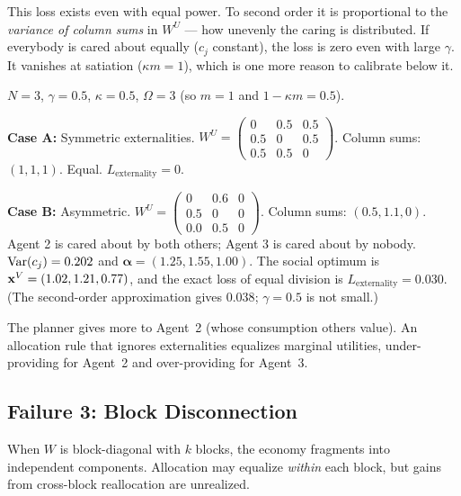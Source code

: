 \documentclass[../structural_economics_book.tex]{subfiles}
\begin{document}
This loss exists even with equal power. To second order it is proportional to the \textit{variance of column sums} in $W^U$ --- how unevenly the caring is distributed. If everybody is cared about equally ($c_j$ constant), the loss is zero even with large $\gamma$. It vanishes at satiation ($\kappa m = 1$), which is one more reason to calibrate below it.

\begin{example}\label{ch02:ex:bond}
$N = 3$, $\gamma = 0.5$, $\kappa = 0.5$, $\Omega = 3$ (so $m = 1$ and $1 - \kappa m = 0.5$).

\textbf{Case A:} Symmetric externalities. $W^U = \begin{pmatrix} 0 & 0.5 & 0.5 \\ 0.5 & 0 & 0.5 \\ 0.5 & 0.5 & 0 \end{pmatrix}$. Column sums: $(1, 1, 1)$. Equal. $L_{\text{externality}} = 0$.

\textbf{Case B:} Asymmetric. $W^U = \begin{pmatrix} 0 & 0.6 & 0 \\ 0.5 & 0 & 0 \\ 0.0 & 0.5 & 0 \end{pmatrix}$. Column sums: $(0.5, 1.1, 0)$. Agent 2 is cared about by both others; Agent 3 is cared about by nobody. $\operatorname{Var}(c_j) = 0.202$ and $\boldsymbol{\alpha} = (1.25, 1.55, 1.00)$. The social optimum is $\mathbf{x}^V = (1.02, 1.21, 0.77)$, and the exact loss of equal division is $L_{\text{externality}} = 0.030$. (The second-order approximation gives $0.038$; $\gamma = 0.5$ is not small.)

The planner gives more to Agent~2 (whose consumption others value). An allocation rule that ignores externalities equalizes marginal utilities, under-providing for Agent~2 and over-providing for Agent~3.
\end{example}


\subsection{Failure 3: Block Disconnection}

When $W$ is block-diagonal with $k$ blocks, the economy fragments into independent components. Allocation may equalize \textit{within} each block, but gains from cross-block reallocation are unrealized.
\end{document}
